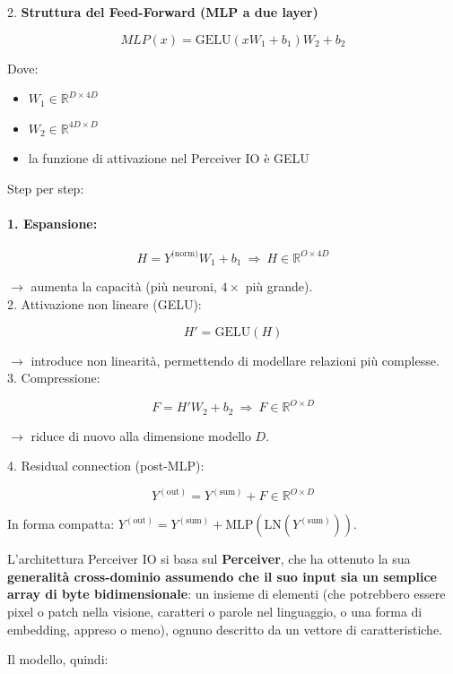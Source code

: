 \documentclass[
  11pt,
]{article}
\begin{document}
2. \textbf{Struttura del Feed-Forward (MLP a due layer)}

\[MLP(x) = \mathrm{GELU}\left( xW_{1} + b_{1} \right)W_{2} + b_{2}\]

Dove:

\begin{itemize}
\item
  \(W_{1} \in \mathbb{R}^{D \times 4D}\)
\item
  \(W_{2} \in \mathbb{R}^{4D \times D}\)
\item
  la funzione di attivazione nel Perceiver IO è GELU
\end{itemize}

Step per step:

\paragraph{1. Espansione:}

\[H = Y^{\text{(norm)}}W_{1} + b_{1}\  \Rightarrow \ H \in \mathbb{R}^{O \times 4D}\]

\(\rightarrow\) aumenta la capacità (più neuroni, \(4 \times\) più
grande).\\
2. Attivazione non lineare (GELU):

\[H' = \mathrm{GELU}(H)\]

\(\rightarrow\) introduce non linearità, permettendo di modellare
relazioni più complesse.\\
3. Compressione:

\[F = H'W_{2} + b_{2}\  \Rightarrow \ F \in \mathbb{R}^{O \times D}\]

\(\rightarrow\) riduce di nuovo alla dimensione modello \(D\).

4. Residual connection (post-MLP):

\[Y^{(\text{out})} = Y^{(\text{sum})} + F \in \mathbb{R}^{O \times D}\]

In forma compatta: $Y^{(\text{out})} = Y^{(\text{sum})} + \mathrm{MLP}(\mathrm{LN}(Y^{(\text{sum})}))$.

L'architettura Perceiver IO si basa sul
\textbf{Perceiver}, che ha ottenuto la sua \textbf{generalità cross-dominio
assumendo che il suo input sia un semplice array di byte
bidimensionale}: un insieme di elementi (che potrebbero essere pixel o
patch nella visione, caratteri o parole nel linguaggio, o una forma di
embedding, appreso o meno), ognuno descritto da un vettore di
caratteristiche.

Il modello, quindi:
\end{document}
